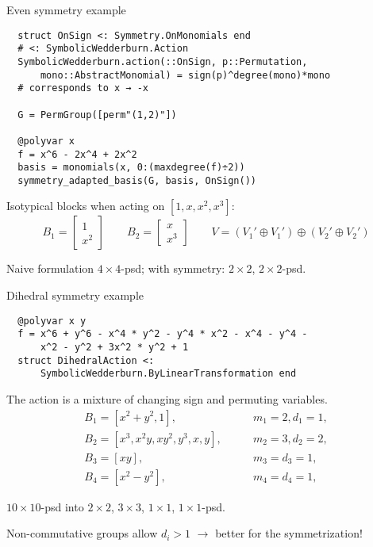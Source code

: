 \begin{frame}[fragile]{Even symmetry example}
\footnotesize
\begin{verbatim}
  struct OnSign <: Symmetry.OnMonomials end
  # <: SymbolicWedderburn.Action
  SymbolicWedderburn.action(::OnSign, p::Permutation,
      mono::AbstractMonomial) = sign(p)^degree(mono)*mono
  # corresponds to x → -x

  G = PermGroup([perm"(1,2)"])

  @polyvar x
  f = x^6 - 2x^4 + 2x^2
  basis = monomials(x, 0:(maxdegree(f)÷2))
  symmetry_adapted_basis(G, basis, OnSign())
\end{verbatim}

  Isotypical blocks when acting on $[1, x, x^2, x^3]$:
\[
  B_1 = \begin{bmatrix}
          1\\
          x^2
        \end{bmatrix}
  \qquad
  B_2 = \begin{bmatrix}
          x\\
          x^3
        \end{bmatrix}
  \qquad
  V = (V_1' \oplus V_1') \oplus (V_2' \oplus V_2')
\]

Naive formulation $4\times 4$-psd; with symmetry: $2\times 2$, $2\times 2$-psd.
\end{frame}

\begin{frame}[fragile]{Dihedral symmetry example}
\footnotesize
  \begin{verbatim}
  @polyvar x y
  f = x^6 + y^6 - x^4 * y^2 - y^4 * x^2 - x^4 - y^4 -
      x^2 - y^2 + 3x^2 * y^2 + 1
  struct DihedralAction <:
      SymbolicWedderburn.ByLinearTransformation end
  \end{verbatim}
  The action is a mixture of changing sign and permuting variables.
  \begin{align*}
    B_1 = [x^2 + y^2, 1], & \qquad m_1 = 2, d_1 = 1,\\
    B_2 = [x^3, x^2y, xy^2, y^3, x, y], & \qquad m_2 = 3, d_2 = 2,\\
    B_3 = [xy], & \qquad m_3 = d_3 = 1,\\
    B_4 = [x^2 - y^2], & \qquad m_4 = d_4 = 1,
  \end{align*}

  $10 \times 10$-psd into $2 \times 2$, $3 \times 3$, $1 \times 1$, $1 \times 1$-psd.

  \alert{Non}-commutative groups allow $d_i > 1$ $\to$ \alert{better} for the symmetrization!
\end{frame}

